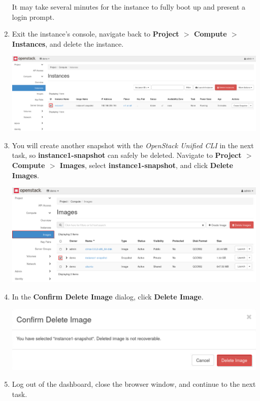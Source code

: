 \documentclass[letterpaper, 12pt]{article}
\begin{document}
\begin{enumerate}
    \begin{notebox}
        It may take several minutes for the instance to fully boot up and present a login prompt.
    \end{notebox}

    \item Exit the instance's console, navigate back to \textbf{Project $>$ Compute $>$ Instances}, and delete the
    instance.

    \begin{center}
        \includegraphics[width=\linewidth]{images/part1/step19.png}
    \end{center}

    \item You will create another snapshot with the \textit{OpenStack Unified CLI} in the next task, so
    \textbf{instance1-snapshot} can safely be deleted. Navigate to \textbf{Project $>$ Compute $>$ Images}, select
    \textbf{instance1-snapshot}, and click \textbf{Delete Images}.

    \begin{center}
        \includegraphics[width=\linewidth]{images/part1/step20.png}
    \end{center}

    \item In the \textbf{Confirm Delete Image} dialog, click \textbf{Delete Image}.
    
    \begin{center}
        \includegraphics[width=\linewidth]{images/part1/step21.png}
    \end{center}

    \item Log out of the dashboard, close the browser window, and continue to the next task.
\end{enumerate}
\end{document}
